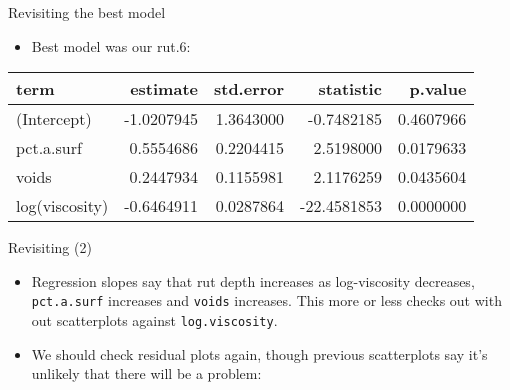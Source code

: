 \begin{frame}[fragile]{Revisiting the best model}
\protect\hypertarget{revisiting-the-best-model}{}
\begin{itemize}
\tightlist
\item
  Best model was our rut.6:
\end{itemize}

\begin{Shaded}
\begin{Highlighting}[]
\NormalTok{)}
\end{Highlighting}
\end{Shaded}

\begin{longtable}[]{@{}lrrrr@{}}
\toprule
term & estimate & std.error & statistic & p.value\tabularnewline
\midrule
\endhead
(Intercept) & -1.0207945 & 1.3643000 & -0.7482185 &
0.4607966\tabularnewline
pct.a.surf & 0.5554686 & 0.2204415 & 2.5198000 &
0.0179633\tabularnewline
voids & 0.2447934 & 0.1155981 & 2.1176259 & 0.0435604\tabularnewline
log(viscosity) & -0.6464911 & 0.0287864 & -22.4581853 &
0.0000000\tabularnewline
\bottomrule
\end{longtable}
\end{frame}

\begin{frame}[fragile]{Revisiting (2)}
\protect\hypertarget{revisiting-2}{}
\begin{itemize}
\tightlist
\item
  Regression slopes say that rut depth increases as log-viscosity
  decreases, \texttt{pct.a.surf} increases and \texttt{voids} increases.
  This more or less checks out with out scatterplots against
  \texttt{log.viscosity}.
\item
  We should check residual plots again, though previous scatterplots say
  it's unlikely that there will be a problem:
\end{itemize}

\begin{Shaded}
\begin{Highlighting}[]
\StringTok{ }\NormalTok{, }\NormalTok{(}\OperatorTok{+}\StringTok{ }
\NormalTok{()}
\end{Highlighting}
\end{Shaded}
\end{frame}

